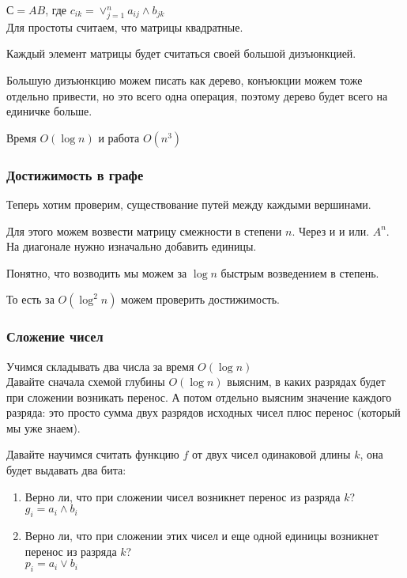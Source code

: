 $С = AB$, где $c_{ik} = \vee_{j = 1}^{n}a_{ij}\wedge b_{jk}$\\

Для простоты считаем, что матрицы квадратные. 

Каждый элемент матрицы будет считаться своей большой дизъюнкцией. 

Большую дизъюнкцию можем писать как дерево, конъюкции можем тоже отдельно привести, но это всего одна операция, поэтому дерево будет 
всего на единичке больше. 

Время $O(\log n)$  и работа $O(n^3)$\\

\subsubsection{Достижимость в графе} 
Теперь хотим проверим, существование путей между каждыми вершинами.

Для этого можем возвести матрицу смежности в степени $n$. Через и и или. $A^n$.\\
На диагонале нужно изначально добавить единицы. 

Понятно, что возводить мы можем за $\log n$ быстрым возведением в степень. 

То есть за $O(\log^2n)$ можем проверить достижимость. 

\subsubsection{Сложение чисел} 
Учимся складывать два числа за время $O(\log n)$\\

Давайте сначала схемой глубины $O(\log n)$ выясним, в каких разрядах будет при сложении возникать перенос.
А потом отдельно выясним значение каждого разряда: это просто сумма двух разрядов исходных чисел плюс перенос (который мы уже знаем).

Давайте научимся считать функцию $f$ от двух чисел одинаковой длины $k$, она будет выдавать два бита:
\begin{enumerate}
	\item Верно ли, что при сложении чисел возникнет перенос из разряда $k$?\\
	$g_i = a_i \wedge b_i$
	\item Верно ли, что при сложении этих чисел и еще одной единицы возникнет перенос из разряда $k$?\\
	$p_i = a_i \vee b_i$
\end{enumerate}

